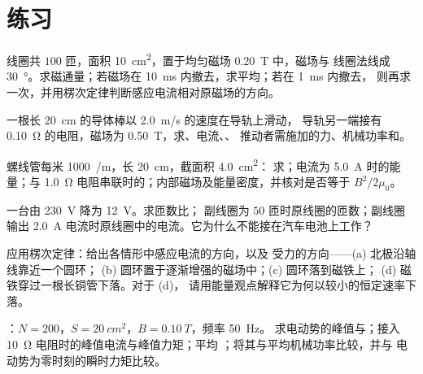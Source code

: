 \section{练习}

\begin{exercise}[$\star$]\label{exo:b1:induction:1}
线圈共 $100$ 匝，面积 \qty{10}{cm^2}，置于均匀磁场 \qty{0.20}{T} 中，磁场与
线圈法线成 \qty{30}{\degree}。求磁通量；若磁场在
\qty{10}{ms} 内撤去，求平均；若在 \qty{1}{ms} 内撤去，
则再求一次，并用楞次定律判断感应电流相对原磁场的方向。
\end{exercise}

\begin{exercise}[$\star$]\label{exo:b1:induction:2}
一根长 \qty{20}{cm} 的导体棒以 \qty{2.0}{m/s} 的速度在导轨上滑动，
导轨另一端接有 \qty{0.10}{\ohm} 的电阻，磁场为 \qty{0.50}{T}，求、电流、、
推动者需施加的力、机械功率和。
\end{exercise}

\begin{exercise}[$\star$]\label{exo:b1:induction:3}
螺线管每米 \qty{1000}{/m}，长 \qty{20}{cm}，截面积 \qty{4.0}{cm^2}：
求；电流为 \qty{5.0}{A} 时的能量；与 \qty{1.0}{\ohm}
电阻串联时的；内部磁场及能量密度，并核对是否等于 $B^2/2\mu_0$。
\end{exercise}

\begin{exercise}[$\star$]\label{exo:b1:induction:4}
一台由 \qty{230}{V} 降为 \qty{12}{V}。求匝数比；
副线圈为 $50$ 匝时原线圈的匝数；副线圈
输出 \qty{2.0}{A} 电流时原线圈中的电流。它为什么不能接在汽车电池上工作？
\end{exercise}

\begin{exercise}[$\star\star$]\label{exo:b1:induction:5}
应用楞次定律：给出各情形中感应电流的方向，以及
受力的方向——(a) 北极沿轴线靠近一个圆环；
(b) 圆环置于逐渐增强的磁场中；(c) 圆环落到磁铁上；
(d) 磁铁穿过一根长铜管下落。对于 (d)，
请用能量观点解释它为何以较小的恒定速率下落。
\end{exercise}

\begin{exercise}[$\star\star$]\label{exo:b1:induction:6}
：$N = 200$，$S = \qty{20}{cm^2}$，$B = \qty{0.10}{T}$，频率 \qty{50}{Hz}。
求电动势的峰值与；接入 \qty{10}{\ohm} 电阻时的峰值电流与峰值力矩；平均
；将其与平均机械功率比较，并与
电动势为零时刻的瞬时力矩比较。
\end{exercise}

